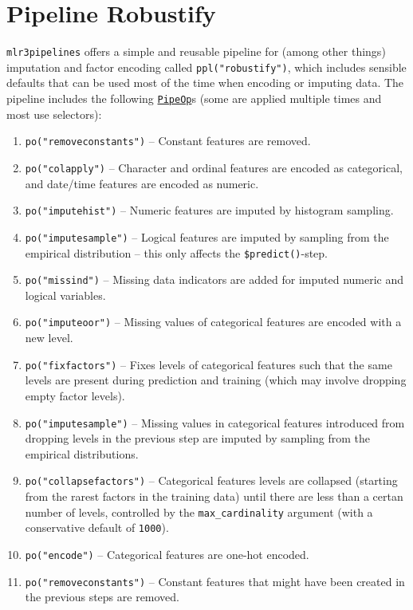 \hypertarget{sec-prepro-robustify}{%
\section{Pipeline Robustify}\label{sec-prepro-robustify}}

\texttt{mlr3pipelines} offers a simple and reusable pipeline for (among
other things) imputation and factor
encoding called
\texttt{ppl("robustify")},
which includes sensible defaults that can be used most of the time when
encoding or imputing data. The pipeline includes the following
\href{https://mlr3pipelines.mlr-org.com/reference/PipeOp.html}{\texttt{PipeOp}}s
(some are applied multiple times and most use selectors):

\begin{enumerate}
\def\labelenumi{\arabic{enumi}.}
\tightlist
\item
  \texttt{po("removeconstants")} -- Constant features are removed.
\item
  \texttt{po("colapply")} -- Character and ordinal features are encoded
  as categorical, and date/time features are encoded as numeric.
\item
  \texttt{po("imputehist")} -- Numeric features are imputed by histogram
  sampling.
\item
  \texttt{po("imputesample")} -- Logical features are imputed by
  sampling from the empirical distribution -- this only affects the
  \texttt{\$predict()}-step.
\item
  \texttt{po("missind")} -- Missing data indicators are added for
  imputed numeric and logical variables.
\item
  \texttt{po("imputeoor")} -- Missing values of categorical features are
  encoded with a new level.
\item
  \texttt{po("fixfactors")} -- Fixes levels of categorical features such
  that the same levels are present during prediction and training (which
  may involve dropping empty factor levels).
\item
  \texttt{po("imputesample")} -- Missing values in categorical features
  introduced from dropping levels in the previous step are imputed by
  sampling from the empirical distributions.
\item
  \texttt{po("collapsefactors")} -- Categorical features levels are
  collapsed (starting from the rarest factors in the training data)
  until there are less than a certan number of levels, controlled by the
  \texttt{max\_cardinality} argument (with a conservative default of
  \texttt{1000}).
\item
  \texttt{po("encode")} -- Categorical features are one-hot encoded.
\item
  \texttt{po("removeconstants")} -- Constant features that might have
  been created in the previous steps are removed.
\end{enumerate}

